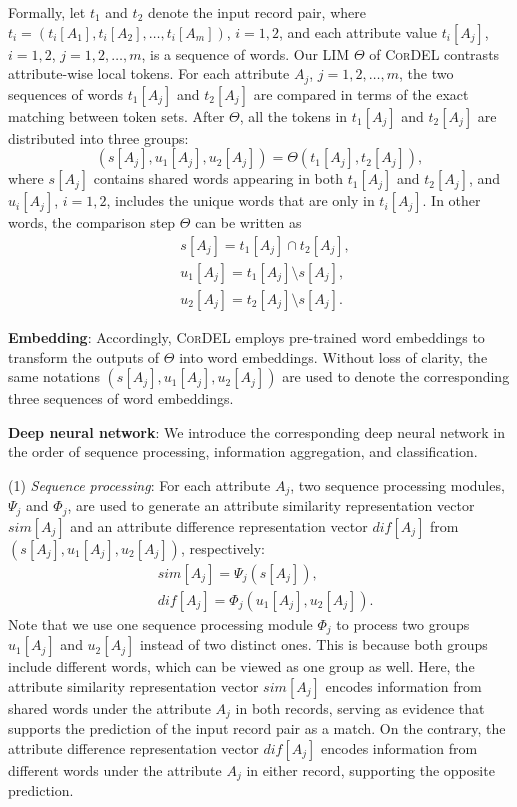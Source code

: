\documentclass[conference]{IEEEtran}
\begin{document}
Formally, let $t_1$ and $t_2$ denote the input record pair, where $t_i=(t_i[A_1], t_i[A_2], \ldots, t_i[A_m])$, $i=1,2$, and each attribute value $t_i[A_j]$, $i=1,2$, $j=1,2,\ldots,m$, is a sequence of words. Our LIM $\Theta$ of \textsc{CorDEL} contrasts attribute-wise local tokens. For each attribute $A_j$, $j=1,2,\ldots,m$, the two sequences of words $t_1[A_j]$ and $t_2[A_j]$ are compared in terms of the exact matching between token sets. After  $\Theta$, all the tokens in $t_1[A_j]$ and $t_2[A_j]$ are distributed into three groups:
\begin{equation}
    (s[A_j], u_1[A_j], u_2[A_j]) = \Theta(t_1[A_j], t_2[A_j]),
\end{equation}
where $s[A_j]$ contains shared words appearing in both $t_1[A_j]$ and $t_2[A_j]$, and $u_i[A_j]$, $i=1,2$, includes the unique words that are only in $t_i[A_j]$. In other words, the comparison step $\Theta$ can be written as
\begin{align}
    &s[A_j] = t_1[A_j] \cap t_2[A_j], \nonumber \\
    &u_1[A_j] = t_1[A_j] \setminus s[A_j], \nonumber \\
    &u_2[A_j] = t_2[A_j] \setminus s[A_j].
\end{align}

\textbf{Embedding}: Accordingly, \textsc{CorDEL} employs pre-trained word embeddings to transform the outputs of $\Theta$ into word embeddings. Without loss of clarity, the same notations $(s[A_j], u_1[A_j], u_2[A_j])$ are used to denote the corresponding three sequences of word embeddings.

\textbf{Deep neural network}: We introduce the corresponding deep neural network in the order of sequence processing, information aggregation, and classification.

(1) \textit{Sequence processing}: For each attribute $A_j$, two sequence processing modules, $\Psi_j$ and $\Phi_j$, are used to generate an attribute similarity representation vector $sim[A_j]$ and an attribute difference representation vector $dif[A_j]$ from $(s[A_j], u_1[A_j], u_2[A_j])$, respectively:
\begin{align}
    &sim[A_j] = \Psi_j(s[A_j]), \label{eqn:summarize1} \\
    &dif[A_j] = \Phi_j(u_1[A_j], u_2[A_j]). \label{eqn:summarize2}
\end{align}
Note that we use one sequence processing module $\Phi_j$ to process two groups $u_1[A_j]$ and $u_2[A_j]$ instead of two distinct ones. This is because both groups include different words, which can be viewed as one group as well. Here, the attribute similarity representation vector $sim[A_j]$ encodes information from shared words under the attribute $A_j$ in both records, serving as evidence that supports the prediction of the input record pair as a match. On the contrary, the attribute difference representation vector $dif[A_j]$ encodes information from different words under the attribute $A_j$ in either record, supporting the opposite prediction.
\end{document}
